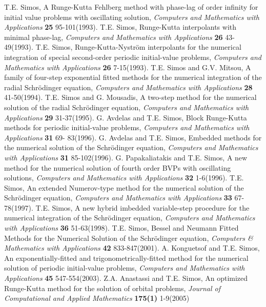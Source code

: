 \documentclass[numreferences]{kluwer}
\begin{document}
\begin{article}
\begin{thebibliography}{120}
 T.E. Simos, A Runge-Kutta Fehlberg method with phase-lag of order
infinity for initial value problems with oscillating solution, {\it
Computers and Mathematics with Applications} {\bf 25} 95-101(1993).
 T.E. Simos, Runge-Kutta interpolants with minimal phase-lag,
{\it Computers and Mathematics with Applications} {\bf 26}
43-49(1993).
 T.E. Simos, Runge-Kutta-Nystr\"om interpolants for the numerical
integration of special second-order periodic initial-value problems,
{\it Computers and Mathematics with Applications} {\bf 26}
7-15(1993).
 T.E. Simos and G.V. Mitsou, A family of four-step exponential fitted
methods for the numerical integration of the radial Schr\"odinger
equation, {\it Computers and Mathematics with Applications} {\bf 28}
41-50(1994).
 T.E. Simos and G. Mousadis, A two-step method for the numerical
solution of the radial Schrödinger equation, {\it Computers and
Mathematics with Applications} {\bf 29} 31-37(1995).
 G. Avdelas and T.E. Simos, Block Runge-Kutta methods for periodic
initial-value problems, {\it Computers and Mathematics with
Applications} {\bf 31} 69- 83(1996).
 G. Avdelas and T.E. Simos, Embedded methods for the numerical
solution of the Schr\"odinger equation, {\it Computers and
Mathematics with Applications} {\bf 31} 85-102(1996).
  G. Papakaliatakis and T.E. Simos, A new method for the numerical
solution of fourth order BVPs with oscillating solutions, {\it
Computers and Mathematics with Applications} {\bf 32} 1-6(1996).
  T.E. Simos, An extended Numerov-type method for the numerical
solution of the Schr\"odinger equation, {\it Computers and
Mathematics with Applications} {\bf 33} 67-78(1997).
 T.E. Simos, A new hybrid imbedded variable-step procedure for the
numerical integration of the Schr\"odinger equation, {\it Computers
and Mathematics with Applications} {\bf 36} 51-63(1998).
  T.E. Simos, Bessel and Neumann Fitted Methods for the Numerical
Solution of the Schr\"odinger equation, {\it Computers \&
Mathematics with Applications} {\bf 42} 833-847(2001).
  A. Konguetsof and T.E. Simos, An exponentially-fitted and
trigonometrically-fitted method for the numerical solution of
periodic initial-value problems, {\it Computers and Mathematics with
Applications} {\bf 45} 547-554(2003).
 Z.A. Anastassi and T.E. Simos, An optimized Runge-Kutta method for the solution of orbital problems, {\it Journal of Computational and Applied Mathematics} {\bf 175(1)} 1-9(2005)

\end{thebibliography}
\end{article}
\end{document}
